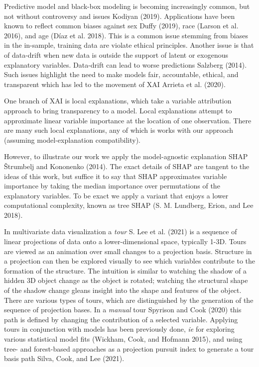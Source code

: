 \documentclass[
]{article}
\begin{document}
Predictive model and black-box modeling is becoming increasingly common, but not without controversy and issues Kodiyan (2019). Applications have been known to reflect common biases against sex Duffy (2019), race (Larson et al. 2016), and age (Díaz et al. 2018). This is a common issue stemming from biases in the in-sample, training data are violate ethical principles. Another issue is that of data-drift when new data is outside the support of latent or exogenous explanatory variables. Data-drift can lead to worse predictions Salzberg (2014). Such issues highlight the need to make models fair, accountable, ethical, and transparent which has led to the movement of XAI Arrieta et al. (2020).

One branch of XAI is local explanations, which take a variable attribution approach to bring transparency to a model. Local explanations attempt to approximate linear variable importance at the location of one observation. There are many such local explanations, any of which is works with our approach (assuming model-explanation compatibility).

However, to illustrate our work we apply the model-agnostic explanation SHAP Štrumbelj and Kononenko (2014). The exact details of SHAP are tangent to the ideas of this work, but suffice it to say that SHAP approximates variable importance by taking the median importance over permutations of the explanatory variables. To be exact we apply a variant that enjoys a lower computational complexity, known as tree SHAP (S. M. Lundberg, Erion, and Lee 2018).

In multivariate data visualization a \emph{tour} S. Lee et al. (2021) is a sequence of linear projections of data onto a lower-dimensional space, typically 1-3D. Tours are viewed as an animation over small changes to a projection basis. Structure in a projection can then be explored visually to see which variables contribute to the formation of the structure. The intuition is similar to watching the shadow of a hidden 3D object change as the object is rotated; watching the structural shape of the shadow change gleans insight into the shape and features of the object. There are various types of tours, which are distinguished by the generation of the sequence of projection bases. In a \emph{manual} tour Spyrison and Cook (2020) this path is defined by changing the contribution of a selected variable. Applying tours in conjunction with models has been previously done, \emph{ie} for exploring various statistical model fits (Wickham, Cook, and Hofmann 2015), and using tree- and forest-based approaches as a projection pursuit index to generate a tour basis path Silva, Cook, and Lee (2021).
\end{document}
